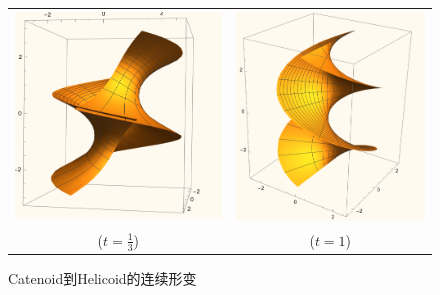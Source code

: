 \begin{figure}[ht]
\begin{tabular}{cc}
                \includegraphics[scale=0.2]{images/catenoid2helicold1_3.png}& \includegraphics[scale=0.2]{images/catenoid2helicold1.png}\\
                ($t=\frac{1}{3}$) & ($t=1$) \\
        \end{tabular}
        \caption{Catenoid到Helicoid的连续形变}
        \label{catenoid2helicoid}
\end{figure}
